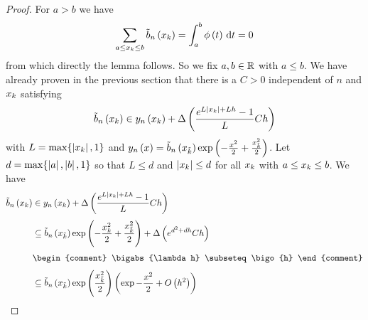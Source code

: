 
\begin{proof}
  For $a > b$ we have
  \begin{align}
    \sum_{a\le x_{k} \le b}\tilde b_{n}\left({x_{k}}\right) = \int_a^b \phi\left( {t} \right)\,\mathrm d{t} = 0
  \end{align}
  from which directly the lemma follows. So we fix $a,b\in\mathbb R$ with $a\le b$. We have already proven in the previous section that there is a $C > 0$ independent of $n$ and $x_{k}$ satisfying
  \begin{align}
    \tilde b_{n}\left({x_{k}}\right) \in y_{n}\left({x_{k}}\right) + \Delta\left( {\frac{e^{L\left|{x_{k}}\right|+Lh}-1}L Ch} \right)
  \end{align}
  with $L = \max\{\left|{x_{k}}\right|,1\}$ and $y_{n}\left({x}\right) = \tilde b_{n}\left({x_{\tilde k}}\right)\exp\left( {-\frac{x^2}2+\frac{x_{\tilde k}^2}2} \right)$. Let $d = \max\{\left|{a}\right|,\left|{b}\right|, 1\}$ so that $L \le d$ and $\left|{x_{k}}\right| \le d$ for all $x_{k}$ with $a\le x_{k} \le b$. We have
  \begin{align}
    \bb{\x} & \in \phin{\x} + \bigabs{\frac{\fe{L\abs{\x}+Lh}-1}L Ch} \nl
    &\subseteq \bb{\xnp} \fexp{-\frac{\x^2}2+\frac{\xnp^2}2} + \bigabs{\fe{d^2+dh} C h} \nl
    &
    \begin{comment}
      \bigabs{\lambda h} \subseteq \bigo{h}
    \end{comment} \nl
    &\subseteq \bb{\xnp} \fexp{\frac{\xnp^2}2} \br{\exp{-\frac{x^2}2} + \bigo{h^2}}
  \end{align}
\end{proof}
